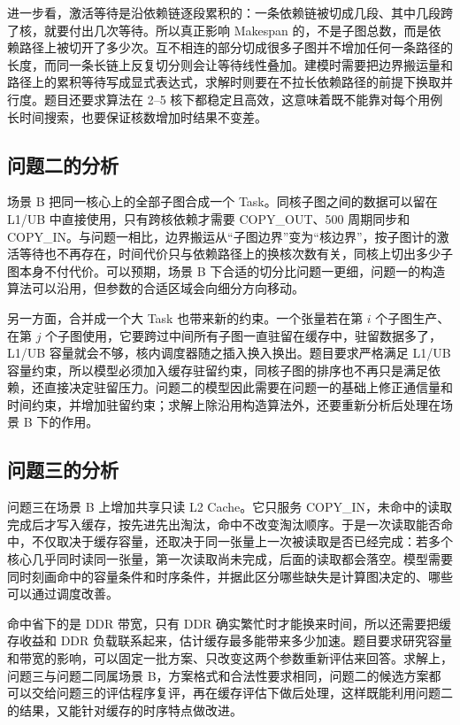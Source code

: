 进一步看，激活等待是沿依赖链逐段累积的：一条依赖链被切成几段、其中几段跨了核，就要付出几次等待。所以真正影响 Makespan 的，不是子图总数，而是依赖路径上被切开了多少次。互不相连的部分切成很多子图并不增加任何一条路径的长度，而同一条长链上反复切分则会让等待线性叠加。建模时需要把边界搬运量和路径上的累积等待写成显式表达式，求解时则要在不拉长依赖路径的前提下换取并行度。题目还要求算法在 2--5 核下都稳定且高效，这意味着既不能靠对每个用例长时间搜索，也要保证核数增加时结果不变差。

\subsection{问题二的分析}

场景 B 把同一核心上的全部子图合成一个 Task。同核子图之间的数据可以留在 L1/UB 中直接使用，只有跨核依赖才需要 COPY\_OUT、500 周期同步和 COPY\_IN。与问题一相比，边界搬运从“子图边界”变为“核边界”，按子图计的激活等待也不再存在，时间代价只与依赖路径上的换核次数有关，同核上切出多少子图本身不付代价。可以预期，场景 B 下合适的切分比问题一更细，问题一的构造算法可以沿用，但参数的合适区域会向细分方向移动。

另一方面，合并成一个大 Task 也带来新的约束。一个张量若在第 $i$ 个子图生产、在第 $j$ 个子图使用，它要跨过中间所有子图一直驻留在缓存中，驻留数据多了，L1/UB 容量就会不够，核内调度器随之插入换入换出。题目要求严格满足 L1/UB 容量约束，所以模型必须加入缓存驻留约束，同核子图的排序也不再只是满足依赖，还直接决定驻留压力。问题二的模型因此需要在问题一的基础上修正通信量和时间约束，并增加驻留约束；求解上除沿用构造算法外，还要重新分析后处理在场景 B 下的作用。

\subsection{问题三的分析}

问题三在场景 B 上增加共享只读 L2 Cache。它只服务 COPY\_IN，未命中的读取完成后才写入缓存，按先进先出淘汰，命中不改变淘汰顺序。于是一次读取能否命中，不仅取决于缓存容量，还取决于同一张量上一次被读取是否已经完成：若多个核心几乎同时读同一张量，第一次读取尚未完成，后面的读取都会落空。模型需要同时刻画命中的容量条件和时序条件，并据此区分哪些缺失是计算图决定的、哪些可以通过调度改善。

命中省下的是 DDR 带宽，只有 DDR 确实繁忙时才能换来时间，所以还需要把缓存收益和 DDR 负载联系起来，估计缓存最多能带来多少加速。题目要求研究容量和带宽的影响，可以固定一批方案、只改变这两个参数重新评估来回答。求解上，问题三与问题二同属场景 B，方案格式和合法性要求相同，问题二的候选方案都可以交给问题三的评估程序复评，再在缓存评估下做后处理，这样既能利用问题二的结果，又能针对缓存的时序特点做改进。
